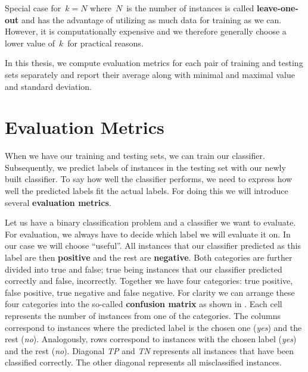 Special case for~$k=N$ where~$N$~is the number of instances is called {\bf leave-one-out}
and has the advantage of 
utilizing as much data for training as we can.
However, it is computationally expensive and
we therefore generally choose a lower value of~$k$~for practical reasons.

In this thesis, we compute evaluation metrics for each pair of training and testing sets separately
and report their average along with minimal and maximal value and standard deviation.


\section{Evaluation Metrics}

When we have our training and testing sets, we can train our classifier.
Subsequently, we predict labels of instances in the testing set with our newly
built classifier.
To say how well the classifier performs, we need to express how well the predicted
labels fit the actual labels.
For doing this we will introduce several {\bf evaluation metrics}.

Let us have a binary classification problem and a classifier we want to evaluate.
For evaluation, we always have to decide which label we will evaluate it on.
In our case we will choose ``useful''.
All instances that our classifier predicted as this label are then {\bf positive} 
and the rest are {\bf negative}.
Both categories are further divided into true and false;
true being instances that our classifier predicted correctly and false, incorrectly.
Together we have four categories:
true positive, false positive, true negative and false negative.
For clarity we can arrange these four categories into the so-called {\bf confusion matrix} 
as shown in .
Each cell represents the number of instances from one of the categories.
The columns correspond to instances where the predicted label is the chosen one (\textit{yes}) and the rest (\textit{no}).
Analogously, rows correspond to instances with the chosen label (\textit{yes}) and the rest (\textit{no}).
Diagonal {\it TP} and {\it TN} represents all instances that have been classified correctly.
The other diagonal represents all misclassified instances.





